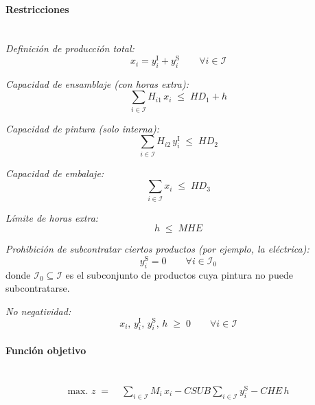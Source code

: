 \paragraph{Restricciones}\mbox{}\\

\textit{Definición de producción total:}
\begin{equation}
x_i = y_i^{\mathrm{I}} + y_i^{\mathrm{S}} \qquad \forall i \in \mathcal{I}
\end{equation}

\textit{Capacidad de ensamblaje (con horas extra):}
\begin{equation}
\sum_{i \in \mathcal{I}} H_{i1}\,x_i \;\leq\; HD_1 + h
\end{equation}

\textit{Capacidad de pintura (solo interna):}
\begin{equation}
\sum_{i \in \mathcal{I}} H_{i2}\,y_i^{\mathrm{I}} \;\leq\; HD_2
\end{equation}

\textit{Capacidad de embalaje:}
\begin{equation}
\sum_{i \in \mathcal{I}} x_i \;\leq\; HD_3
\end{equation}

\textit{Límite de horas extra:}
\begin{equation}
h \;\leq\; MHE
\end{equation}

\textit{Prohibición de subcontratar ciertos productos (por ejemplo, la eléctrica):}
\begin{equation}
y_i^{\mathrm{S}} = 0 \qquad \forall i \in \mathcal{I}_0
\end{equation}
donde $\mathcal{I}_0 \subseteq \mathcal{I}$ es el subconjunto de productos cuya pintura no puede subcontratarse.

\textit{No negatividad:}
\begin{equation}
x_i,\, y_i^{\mathrm{I}},\, y_i^{\mathrm{S}},\, h \;\geq\; 0 \qquad \forall i \in \mathcal{I}
\end{equation}

\paragraph{Función objetivo}\mbox{}\\
\begin{align}
\mbox{max. } z \;=\;& 
\sum_{i \in \mathcal{I}} M_i\,x_i
- CSUB \sum_{i \in \mathcal{I}} y_i^{\mathrm{S}}
- CHE\,h
\end{align}

